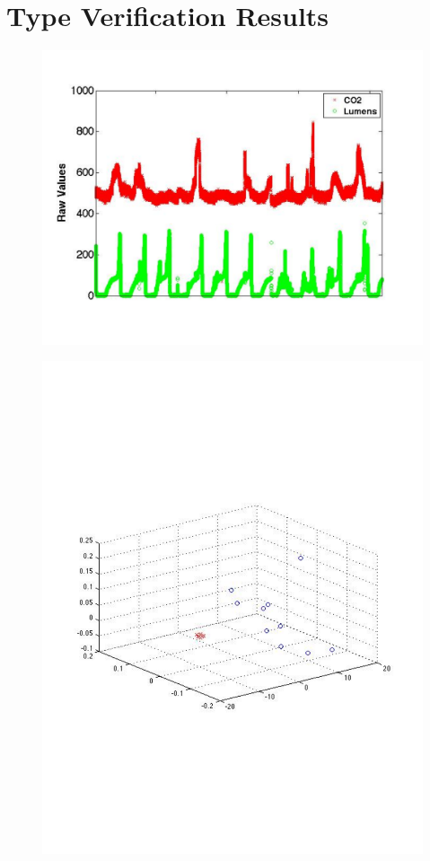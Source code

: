 \section{Type Verification Results}

\begin{figure}[t!] %
\centering
\includegraphics[width=0.75\columnwidth]{figs/KETI413_co2_light_raw}
\caption{}
\label{fig:co2_light_raw}
\end{figure}

\begin{figure}[t!] %
\centering
\includegraphics[width=0.75\columnwidth]{figs/EMD_LF_PCA_413_co2_light}
\caption{}
\label{fig:EMD_LF_PCA}
\end{figure}


